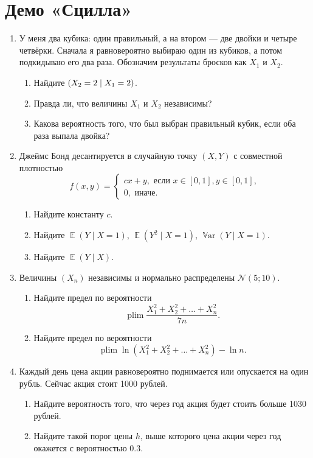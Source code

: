 \documentclass[12pt]{article}
\DeclareMathOperator{\Var}{\mathbb{V}ar}
\DeclareMathOperator{\plim}{plim}
\let\P\relax
\DeclareMathOperator{\P}{\mathbb{P}}
\DeclareMathOperator{\E}{\mathbb{E}}
\newcommand \cN{\mathcal{N}}
\begin{document}
\section*{Демо «Сцилла»}
\begin{enumerate}
\item У меня два кубика: один правильный, а на втором — две двойки и четыре четвёрки. 
Сначала я равновероятно выбираю один из кубиков, а потом подкидываю его два раза. 
Обозначим результаты бросков как $X_1$ и $X_2$.
\begin{enumerate}
    \item Найдите $\P(X_2 = 2 \mid X_1 = 2)$. 
    \item Правда ли, что величины $X_1$ и $X_2$ независимы?
    \item Какова вероятность того, что был выбран правильный кубик, если оба раза выпала двойка?
\end{enumerate}


\item Джеймс Бонд десантируется в случайную точку $(X, Y)$ с совместной плотностью 
\[
f(x, y) = \begin{cases}
    cx + y, \text{ если } x\in [0, 1], y\in [0, 1], \\
    0, \text{ иначе.}
\end{cases}
\]
\begin{enumerate}
    \item Найдите константу $c$. 
    \item Найдите $\E(Y \mid X = 1)$, $\E(Y^2 \mid X= 1)$, $\Var(Y \mid X = 1)$.
    \item Найдите $\E(Y \mid X)$.
\end{enumerate}

\item Величины $(X_n)$ независимы и нормально распределены $\cN(5; 10)$.

\begin{enumerate}
  \item Найдите предел по вероятности
  \[
  \plim \frac{X_1^2 + X_2^2 + \dots + X_n^2}{7n}.
  \]
  \item Найдите предел по вероятности
  \[
  \plim \ln(X_1^2 + X_2^2 + \dots + X_n^2) - \ln n.
  \]
\end{enumerate}

\item Каждый день цена акции равновероятно поднимается или опускается на один рубль. 
Сейчас акция стоит 1000 рублей.
\begin{enumerate}
    \item Найдите вероятность того, что через год акция будет стоить больше 1030 рублей.
    \item Найдите такой порог цены $h$, выше которого цена акции через год окажется с вероятностью $0.3$.
\end{enumerate}


\end{enumerate}
\end{document}
